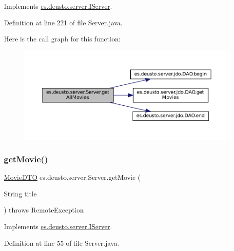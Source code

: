 Implements \mbox{\hyperlink{interfacees_1_1deusto_1_1server_1_1_i_server_adf8c1aa53cf63eafa97299c898539938}{es.\+deusto.\+server.\+I\+Server}}.



Definition at line 221 of file Server.\+java.

Here is the call graph for this function\+:
\nopagebreak
\begin{figure}[H]
\begin{center}
\leavevmode
\includegraphics[width=350pt]{classes_1_1deusto_1_1server_1_1_server_a12879447707ea74459bfed6fffab514b_cgraph}
\end{center}
\end{figure}
\mbox{\label{classes_1_1deusto_1_1server_1_1_server_a7e4544c63bcf2b2d3abce0d2ff1567ac}} 
\subsubsection{\texorpdfstring{getMovie()}{getMovie()}}
{\footnotesize\ttfamily \mbox{\hyperlink{classes_1_1deusto_1_1server_1_1data_1_1_movie_d_t_o}{Movie\+D\+TO}} es.\+deusto.\+server.\+Server.\+get\+Movie (\begin{DoxyParamCaption}\item[{String}]{title }\end{DoxyParamCaption}) throws Remote\+Exception}



Implements \mbox{\hyperlink{interfacees_1_1deusto_1_1server_1_1_i_server_a2b7883e416d98a7c92de13cbed7af450}{es.\+deusto.\+server.\+I\+Server}}.



Definition at line 55 of file Server.\+java.

